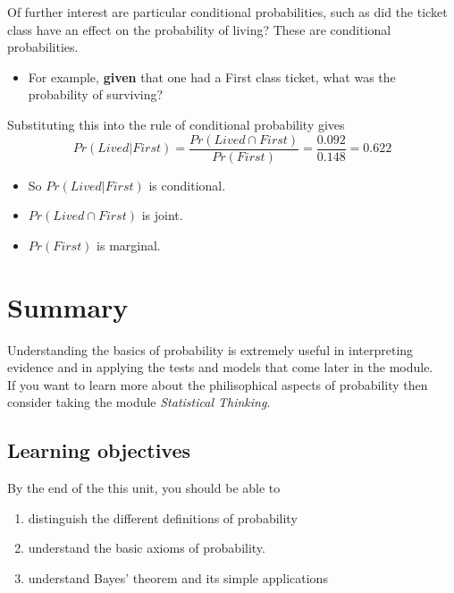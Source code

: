 \documentclass[
  oneside]{krantz}
\providecommand{\tightlist}{%
  \setlength{\itemsep}{0pt}\setlength{\parskip}{0pt}}
\begin{document}
Of further interest are particular conditional probabilities, such as
did the ticket class have an effect on the probability of living?
These are conditional probabilities.

\begin{itemize}
\tightlist
\item
  For example, \textbf{given} that one had a First class ticket, what was the probability of surviving?
\end{itemize}

Substituting this into the rule of conditional probability gives
\[Pr(Lived|First)  = \frac{Pr(Lived \cap First)} {Pr(First)} = \frac{0.092} {0.148} = 0.622\]

\begin{itemize}
\tightlist
\item
  So \(Pr(Lived|First)\) is conditional.
\item
  \(Pr(Lived \cap First)\) is joint.
\item
  \(Pr(First)\) is marginal.
\end{itemize}

\hypertarget{SUMprob}{%
\section{Summary}\label{SUMprob}}

Understanding the basics of probability is extremely useful in interpreting evidence and in applying the tests and models that come later in the module.\\
If you want to learn more about the philisophical aspects of probability then consider taking the module \emph{Statistical Thinking}.

\hypertarget{learning-objectives-1}{%
\subsection{Learning objectives}\label{learning-objectives-1}}

By the end of the this unit, you should be able to

\begin{enumerate}
\def\labelenumi{\arabic{enumi}.}
\tightlist
\item
  distinguish the different definitions of probability
\item
  understand the basic axioms of probability.
\item
  understand Bayes' theorem and its simple applications
\end{enumerate}
\end{document}
